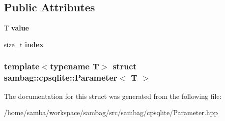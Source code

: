 \subsection*{Public Attributes}
\begin{DoxyCompactItemize}
\item 
\hypertarget{structsambag_1_1cpsqlite_1_1_parameter_a583a81c6aea0641db63392fe36e7e43a}{
T {\bfseries value}}
\label{structsambag_1_1cpsqlite_1_1_parameter_a583a81c6aea0641db63392fe36e7e43a}

\item 
\hypertarget{structsambag_1_1cpsqlite_1_1_parameter_a895e4e6e74b0fffad9b05fcf74e52107}{
size\_\-t {\bfseries index}}
\label{structsambag_1_1cpsqlite_1_1_parameter_a895e4e6e74b0fffad9b05fcf74e52107}

\end{DoxyCompactItemize}
\subsubsection*{template$<$typename T$>$ struct sambag::cpsqlite::Parameter$<$ T $>$}



The documentation for this struct was generated from the following file:\begin{DoxyCompactItemize}
\item 
/home/samba/workspace/sambag/src/sambag/cpsqlite/Parameter.hpp\end{DoxyCompactItemize}
